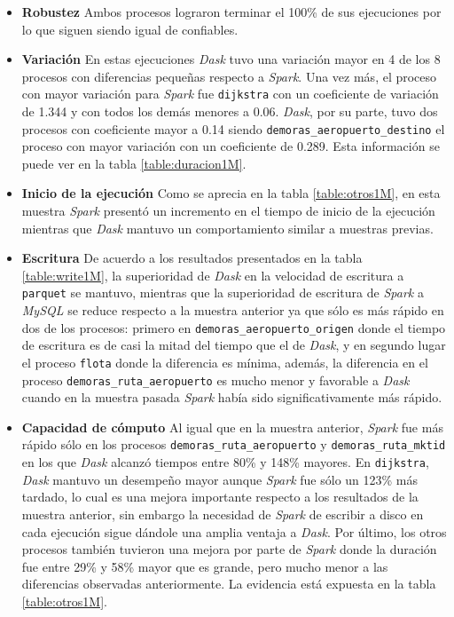 \begin{itemize}
	\item \textbf{Robustez} Ambos procesos lograron terminar el 100\% de sus ejecuciones por lo que siguen siendo igual de confiables.
	
	\item \textbf{Variación} En estas ejecuciones \textit{Dask} tuvo una variación mayor en 4 de los 8 procesos con diferencias pequeñas respecto a \textit{Spark}. Una vez más, el proceso con mayor variación para \textit{Spark} fue \texttt{dijkstra} con un coeficiente de variación de 1.344 y con todos los demás menores a 0.06. \textit{Dask}, por su parte, tuvo dos procesos con coeficiente mayor a 0.14 siendo \texttt{demoras\_aeropuerto\_destino} el proceso con mayor variación con un coeficiente de 0.289. Esta información se puede ver en la tabla \ref{table:duracion1M}.
	
	\item \textbf{Inicio de la ejecución} Como se aprecia en la tabla \ref{table:otros1M}, en esta muestra \textit{Spark} presentó un incremento en el tiempo de inicio de la ejecución mientras que \textit{Dask} mantuvo un comportamiento similar a muestras previas. 
	
	\item \textbf{Escritura} De acuerdo a los resultados presentados en la tabla \ref{table:write1M}, la superioridad de \textit{Dask} en la velocidad de escritura a \texttt{parquet} se mantuvo, mientras que la superioridad de escritura de \textit{Spark} a \textit{MySQL} se reduce respecto a la muestra anterior ya que sólo es más rápido en dos de los procesos: primero en \texttt{demoras\_aeropuerto\_origen} donde el tiempo de escritura es de casi la mitad del tiempo que el de \textit{Dask}, y en segundo lugar el proceso \texttt{flota} donde la diferencia es mínima, además, la diferencia en el proceso \texttt{demoras\_ruta\_aeropuerto} es mucho menor y favorable a \textit{Dask} cuando en la muestra pasada \textit{Spark} había sido significativamente más rápido. 
	
	\item \textbf{Capacidad de cómputo} Al igual que en la muestra anterior, \textit{Spark} fue más rápido sólo en los procesos \texttt{demoras\_ruta\_aeropuerto} y \texttt{demoras\_ruta\_mktid} en los que \textit{Dask} alcanzó tiempos entre 80\% y 148\% mayores. En \texttt{dijkstra}, \textit{Dask} mantuvo un desempeño mayor aunque \textit{Spark} fue sólo un 123\% más tardado, lo cual es una mejora importante respecto a los resultados de la muestra anterior, sin embargo la necesidad de \textit{Spark} de escribir a disco en cada ejecución sigue dándole una amplia ventaja a \textit{Dask}. Por último, los otros procesos también tuvieron una mejora por parte de \textit{Spark} donde la duración fue entre 29\% y 58\% mayor que es grande, pero mucho menor a las diferencias observadas anteriormente. La evidencia está expuesta en la tabla \ref{table:otros1M}.
	

\end{itemize}
